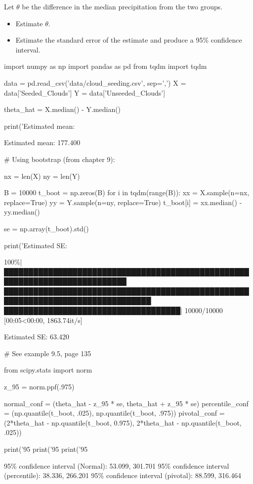Let \(\theta\) be the difference in the median precipitation from the
two groups.

\begin{itemize}[tightlist]
\item
  Estimate \(\theta\).
\item
  Estimate the standard error of the estimate and produce a 95\%
  confidence interval.
\end{itemize}

\begin{python}
import numpy as np
import pandas as pd
from tqdm import tqdm

data = pd.read_csv('data/cloud_seeding.csv', sep=',')
X = data['Seeded_Clouds']
Y = data['Unseeded_Clouds']
\end{python}

\begin{python}
theta_hat = X.median() - Y.median()

print('Estimated mean: %
\end{python}

\begin{console}
Estimated mean: 177.400
\end{console}

\begin{python}
# Using bootstrap (from chapter 9):

nx = len(X)
ny = len(Y)

B = 10000
t_boot = np.zeros(B)
for i in tqdm(range(B)):
    xx = X.sample(n=nx, replace=True)
    yy = Y.sample(n=ny, replace=True)
    t_boot[i] = xx.median() - yy.median()
    
se = np.array(t_boot).std()

print('Estimated SE: %
\end{python}

\begin{console}
100\%|███████████████████████████████████████████████████████████████████████████
████████████████████████████████████████████████████████████████████████████████
████████████████████████████████████| 10000/10000 [00:05<00:00, 1863.74it/s]
\end{console}

\begin{console}
Estimated SE: 63.420
\end{console}

\begin{python}
# See example 9.5, page 135

from scipy.stats import norm

z_95 = norm.ppf(.975)

normal_conf = (theta_hat - z_95 * se, theta_hat + z_95 * se)
percentile_conf = (np.quantile(t_boot, .025), np.quantile(t_boot, .975))
pivotal_conf = (2*theta_hat - np.quantile(t_boot, 0.975), 2*theta_hat - np.quantile(t_boot, .025))

print('95%
print('95%
print('95%
\end{python}

\begin{console}
95\% confidence interval (Normal):        53.099, 301.701
95\% confidence interval (percentile):    38.336, 266.201
95\% confidence interval (pivotal):       88.599, 316.464
\end{console}

